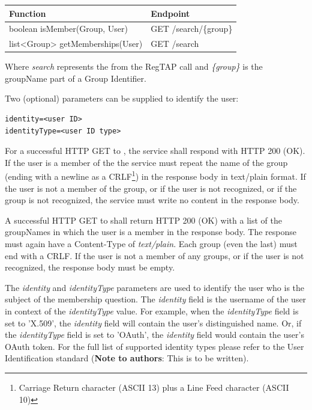 \documentclass[11pt,a4paper]{ivoa}
\begin{document}
\vspace{3mm}
\begin{tabular}{l l}
\textbf{Function} & \textbf{Endpoint} \\
\hline
boolean isMember(Group, User) & GET /search/\{group\} \\
\hline
list<Group> getMemberships(User) & GET /search \\
\hline
\end{tabular}
\vspace{3mm}

Where \emph{search} represents the  from the RegTAP call and \emph{\{group\}} is the groupName part of a Group Identifier.

Two (optional) parameters can be supplied to identify the user:

\begin{verbatim}
identity=<user ID>
identityType=<user ID type>
\end{verbatim}

For a successful HTTP GET to , the service shall respond with HTTP 200 (OK).  If the user is a member of the  the service must repeat the name of the group (ending with a newline as a CRLF\footnote{Carriage Return character (ASCII 13) plus a Line Feed character (ASCII 10)}) in the response body in text/plain format.  If the user is not a member of the group, or if the user is not recognized, or if the group is not recognized, the service must write no content in the response body.

A successful HTTP GET to  shall return HTTP 200 (OK) with a list of the groupNames in which the user is a member in the response body.  The response must again have a Content-Type of \emph {text/plain}.  Each group (even the last) must end with a CRLF.  If the user is not a member of any groups, or if the user is not recognized, the response body must be empty.

The \emph{identity} and \emph{identityType} parameters are used to identify the user who is the subject of the membership question.  The \emph{identity} field is the username of the user in context of the \emph{identityType} value.  For example, when the \emph{identityType} field is set to 'X.509', the \emph{identity} field will contain the user's distinguished name.  Or, if the \emph{identityType} field is set to 'OAuth', the \emph{identity} field would contain the user's OAuth token.  For the full list of supported identity types please refer to the User Identification standard (\textbf{Note to authors}: This is to be written).
\end{document}
